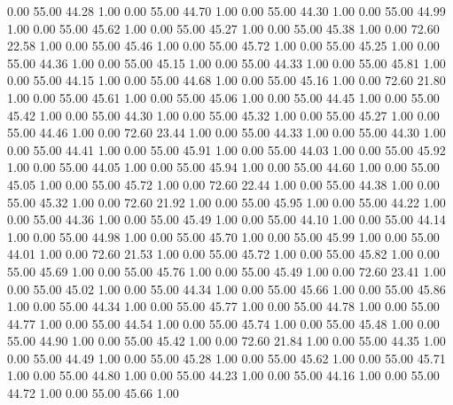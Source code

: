    0.00   55.00   44.28   1.00
   0.00   55.00   44.70   1.00
   0.00   55.00   44.30   1.00
   0.00   55.00   44.99   1.00
   0.00   55.00   45.62   1.00
   0.00   55.00   45.27   1.00
   0.00   55.00   45.38   1.00
   0.00   72.60   22.58   1.00
   0.00   55.00   45.46   1.00
   0.00   55.00   45.72   1.00
   0.00   55.00   45.25   1.00
   0.00   55.00   44.36   1.00
   0.00   55.00   45.15   1.00
   0.00   55.00   44.33   1.00
   0.00   55.00   45.81   1.00
   0.00   55.00   44.15   1.00
   0.00   55.00   44.68   1.00
   0.00   55.00   45.16   1.00
   0.00   72.60   21.80   1.00
   0.00   55.00   45.61   1.00
   0.00   55.00   45.06   1.00
   0.00   55.00   44.45   1.00
   0.00   55.00   45.42   1.00
   0.00   55.00   44.30   1.00
   0.00   55.00   45.32   1.00
   0.00   55.00   45.27   1.00
   0.00   55.00   44.46   1.00
   0.00   72.60   23.44   1.00
   0.00   55.00   44.33   1.00
   0.00   55.00   44.30   1.00
   0.00   55.00   44.41   1.00
   0.00   55.00   45.91   1.00
   0.00   55.00   44.03   1.00
   0.00   55.00   45.92   1.00
   0.00   55.00   44.05   1.00
   0.00   55.00   45.94   1.00
   0.00   55.00   44.60   1.00
   0.00   55.00   45.05   1.00
   0.00   55.00   45.72   1.00
   0.00   72.60   22.44   1.00
   0.00   55.00   44.38   1.00
   0.00   55.00   45.32   1.00
   0.00   72.60   21.92   1.00
   0.00   55.00   45.95   1.00
   0.00   55.00   44.22   1.00
   0.00   55.00   44.36   1.00
   0.00   55.00   45.49   1.00
   0.00   55.00   44.10   1.00
   0.00   55.00   44.14   1.00
   0.00   55.00   44.98   1.00
   0.00   55.00   45.70   1.00
   0.00   55.00   45.99   1.00
   0.00   55.00   44.01   1.00
   0.00   72.60   21.53   1.00
   0.00   55.00   45.72   1.00
   0.00   55.00   45.82   1.00
   0.00   55.00   45.69   1.00
   0.00   55.00   45.76   1.00
   0.00   55.00   45.49   1.00
   0.00   72.60   23.41   1.00
   0.00   55.00   45.02   1.00
   0.00   55.00   44.34   1.00
   0.00   55.00   45.66   1.00
   0.00   55.00   45.86   1.00
   0.00   55.00   44.34   1.00
   0.00   55.00   45.77   1.00
   0.00   55.00   44.78   1.00
   0.00   55.00   44.77   1.00
   0.00   55.00   44.54   1.00
   0.00   55.00   45.74   1.00
   0.00   55.00   45.48   1.00
   0.00   55.00   44.90   1.00
   0.00   55.00   45.42   1.00
   0.00   72.60   21.84   1.00
   0.00   55.00   44.35   1.00
   0.00   55.00   44.49   1.00
   0.00   55.00   45.28   1.00
   0.00   55.00   45.62   1.00
   0.00   55.00   45.71   1.00
   0.00   55.00   44.80   1.00
   0.00   55.00   44.23   1.00
   0.00   55.00   44.16   1.00
   0.00   55.00   44.72   1.00
   0.00   55.00   45.66   1.00

